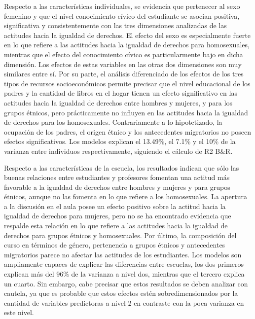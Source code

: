 \documentclass[12pt,twoside]{templates/facsothesis}
\begin{document}
Respecto a las características individuales, se evidencia que pertenecer al sexo femenino y que el nivel conocimiento cívico del estudiante se asocian positiva, significativa y consistentemente con las tres dimensiones analizadas de las actitudes hacia la igualdad de derechos. El efecto del sexo es especialmente fuerte en lo que refiere a las actitudes hacia la igualdad de derechos para homosexuales, mientras que el efecto del conocimiento cívico es particularmente bajo en dicha dimensión. Los efectos de estas variables en las otras dos dimensiones son muy similares entre sí. Por su parte, el análisis diferenciado de los efectos de los tres tipos de recursos socioeconómicos permite precisar que el nivel educacional de los padres y la cantidad de libros en el hogar tienen un efecto significativo en las actitudes hacia la igualdad de derechos entre hombres y mujeres, y para los grupos étnicos, pero prácticamente no influyen en las actitudes hacia la igualdad de derechos para los homosexuales. Contrariamente a lo hipotetizado, la ocupación de los padres, el origen étnico y los antecedentes migratorios no poseen efectos significativos. Los modelos explican el 13.49\%, el 7.1\% y el 10\% de la varianza entre individuos respectivamente, siguiendo el cálculo de R2 B\&R.

Respecto a las características de la escuela, los resultados indican que sólo las buenas relaciones entre estudiantes y profesores fomentan una actitud más favorable a la igualdad de derechos entre hombres y mujeres y para grupos étnicos, aunque no las fomenta en lo que refiere a los homosexuales. La apertura a la discusión en el aula posee un efecto positivo sobre la actitud hacia la igualdad de derechos para mujeres, pero no se ha encontrado evidencia que respalde esta relación en lo que refiere a las actitudes hacia la igualdad de derechos para grupos étnicos y homosexuales. Por último, la composición del curso en términos de género, pertenencia a grupos étnicos y antecedentes migratorios parece no afectar las actitudes de los estudiantes. Los modelos son ampliamente capaces de explicar las diferencias entre escuelas, los dos primeros explican más del 96\% de la varianza a nivel dos, mientras que el tercero explica un cuarto. Sin embargo, cabe precisar que estos resultados se deben analizar con cautela, ya que es probable que estos efectos estén sobredimensionados por la cantidad de variables predictoras a nivel 2 en contraste con la poca varianza en este nivel.
\end{document}
